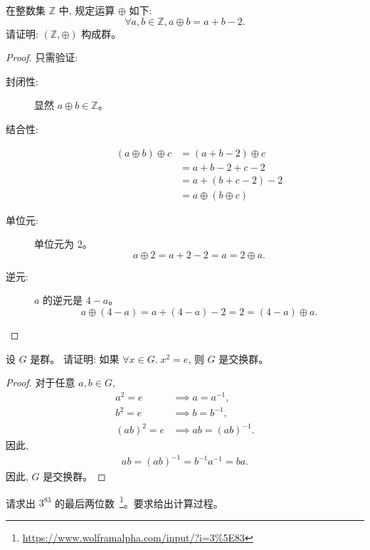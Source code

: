 \documentclass[a4paper, justified]{tufte-handout}
\begin{document}
\begin{problem}
  在整数集 $\mathbb{Z}$ 中, 规定运算 $\oplus$ 如下:
  \[
    \forall a, b \in \mathbb{Z}, a \oplus b = a + b - 2.
  \]
  请证明: $(\mathbb{Z}, \oplus)$ 构成群。
\end{problem}

\begin{proof}
  只需验证:
  \begin{description}
    \item[封闭性:] 显然 $a \oplus b \in \mathbb{Z}$。
    \item[结合性:]
      \begin{align*}
        (a \oplus b) \oplus c &= (a + b - 2) \oplus c \\
          &= a + b - 2 + c - 2 \\
          &= a + (b + c - 2) - 2 \\
          &= a \oplus (b \oplus c)
      \end{align*}
    \item[单位元:] 单位元为 2。
      \[
        a \oplus 2 = a + 2 - 2 = a = 2 \oplus a.
      \]
    \item[逆元:] $a$ 的逆元是 $4-a$。
      \[
        a \oplus (4 - a) = a + (4 - a) - 2 = 2 = (4 - a) \oplus a.
      \]
  \end{description}
\end{proof}

\begin{problem}
  设 $G$ 是群。
  请证明: 如果 $\forall x \in G.\; x^2 = e$,
  则 $G$ 是交换群。
\end{problem}

\begin{proof}
  对于任意 $a, b \in G$,
  \begin{align*}
    a^{2} = e &\implies a = a^{-1}, \\
    b^{2} = e &\implies b = b^{-1}, \\
    (ab)^{2} = e &\implies ab = (ab)^{-1}.
  \end{align*}
  因此,
  \begin{align*}
    ab = (ab)^{-1} = b^{-1} a^{-1} = ba.
  \end{align*}
  因此, $G$ 是交换群。
\end{proof}

\begin{problem}
  请求出 $3^{83}$ 的最后两位数~\footnote{\url{https://www.wolframalpha.com/input/?i=3\%5E83}}。要求给出计算过程。
\end{problem}
\end{document}
